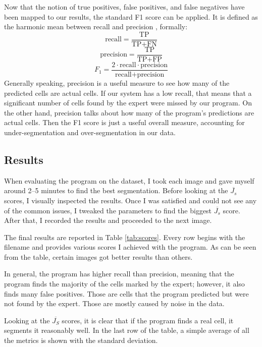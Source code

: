 \documentclass[
  digital,     %
  oneside,     %
  nosansbold,  %
  nocolorbold, %
  lof,         %
  lot,         %
]{fithesis4}
\begin{document}
Now that the notion of true positives, false positives, and false negatives have
been mapped to our results, the standard F1 score can be applied. It is defined as
the harmonic mean between recall and precision \cite{sklearn-f1score}, formally:
$$\text{recall} = \frac{\text{TP}}{\text{TP} + \text{FN}}$$
$$\text{precision} = \frac{\text{TP}}{\text{TP} + \text{FP}}$$
$$F_1 = \frac{2 \cdot \text{recall} \cdot \text{precision}}{\text{recall} +
\text{precision}}$$
Generally speaking, precision is a useful measure to see how many of the predicted
cells are actual cells. If our system has a low recall, that means that a
significant number of cells found by the expert were missed by our program. On
the other hand, precision talks about how many of the program's predictions are actual
cells. Then the F1 score is just a useful overall measure, accounting for
under-segmentation and over-segmentation in our data.

\subsection{Results}
When evaluating the program on the dataset, I took each image and gave myself around 2--5
minutes to find the best segmentation. Before looking at the $\overline{J_s}$ scores, I
visually inspected the results. Once I was satisfied and could not see any of the common
issues, I tweaked the parameters to find the biggest $\overline{J_s}$ score.
After that, I recorded the results and proceeded to the next image.

The final results are reported in Table \ref{tab:scores}. Every row begins
with the filename and provides various scores I achieved with the
program. As can be seen from the table, certain images got better results than
others.

In general, the program has higher recall than precision, meaning that the
program finds the majority of the cells marked by the expert; however, it also
finds many false positives. Those are cells that the program predicted but were
not found by the expert. Those are mostly caused by noise in the data.

Looking at the $\overline{J_S}$ scores, it is clear that if the program finds a
real cell, it segments it reasonably well. In the last row of the table, a simple average of all the metrics is shown with the standard deviation.
\end{document}
